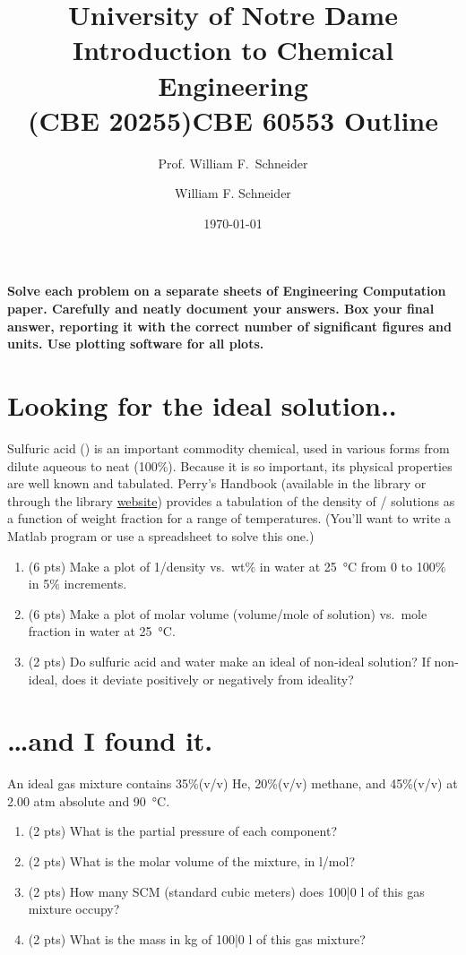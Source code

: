 \documentclass[11pt]{article}
\title{University of Notre Dame\\Introduction to Chemical Engineering\\(CBE 20255)}
\author{Prof. William F.\ Schneider}
\author{William F. Schneider}
\date{\today}
\title{CBE 60553 Outline}
\begin{document}
\begin{options}
\end{options}

\noindent \textbf{Solve each problem on a separate sheets of Engineering Computation paper.  Carefully and neatly document your answers. Box your final answer, reporting it with the correct number of significant figures and units.  Use plotting software for all plots.}


\section{Looking for the ideal solution..}
\label{sec-1}
Sulfuric acid () is an important commodity chemical, used in various forms from dilute aqueous to neat (100\%).  Because it is so important, its physical properties are well known and tabulated.  Perry's Handbook (available in the library or through the library \href{http://onesearch.library.nd.edu/NDU:ebook:ndu_aleph003064056}{website}) provides a tabulation of the density of / solutions as a function of weight fraction for a range of temperatures.  (You'll want to write a Matlab program or use a spreadsheet to solve this one.)

\begin{enumerate}
\item (6 pts) Make a plot of 1/density vs.~wt\%  in water at \SI{25}{\celsius} from 0 to 100\% in 5\% increments.
\item (6 pts) Make a plot of molar volume (volume/mole of solution) vs.~mole fraction  in water at \SI{25}{\celsius}.
\item (2 pts) Do sulfuric acid and water make an ideal of non-ideal solution?  If non-ideal, does it deviate positively or negatively from ideality?
\end{enumerate}

\section{\ldots{}and I found it.}
\label{sec-2}
An ideal gas mixture contains 35\%(v/v) He, 20\%(v/v) methane, and 45\%(v/v)  at 2.00 atm absolute and \SI{90}{\celsius}.

\begin{enumerate}
\item (2 pts) What is the partial pressure of each component?
\item (2 pts) What is the molar volume of the mixture, in l/mol?
\item (2 pts) How many SCM (standard cubic meters) does 100\bar{0} l of this gas mixture occupy?
\item (2 pts) What is the mass in kg of 100\bar{0} l of this gas mixture?
\end{enumerate}
\end{document}
